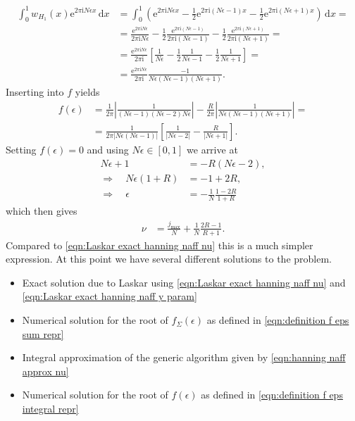 \documentclass[english, parskip=full]{scrartcl}     %
\newcommand{\intx}{}
\newcommand{\kla}{}
\newcommand{\klam}{}
\newcommand{\tecxt}{}
\renewcommand{\i}{\text{i}}
\newcommand{\e}{\text{e}}
\begin{document}
\begin{align}
\intx\int_{0}^{1} w_{H_1}(x) \e^{2\pi\i N\epsilon x} \, \mathrm{d}x &= \intx\int_{0}^{1} \kla\left( \e^{2\pi\i N\epsilon x} - \frac{1}{2} \e^{2\pi\i (N\epsilon - 1) x} - \frac{1}{2} \e^{2\pi\i (N\epsilon + 1) x} \right) \, \mathrm{d}x = \\
&= \frac{\e^{2\pi\i N\epsilon}}{2\pi\i N \epsilon} - \frac{1}{2} \frac{\e^{2\pi\i (N\epsilon - 1)}}{2\pi\i (N\epsilon - 1)} - \frac{1}{2} \frac{\e^{2\pi\i (N\epsilon + 1)}}{2\pi\i (N\epsilon + 1)} = \\
&= \frac{\e^{2\pi\i N\epsilon}}{2\pi\i} \klam\left[ \frac{1}{N\epsilon} - \frac{1}{2} \frac{1}{N\epsilon - 1} - \frac{1}{2} \frac{1}{N\epsilon + 1} \right] = \\
&= \frac{\e^{2\pi\i N\epsilon}}{2\pi\i} \frac{-1}{N\epsilon (N\epsilon - 1) (N\epsilon + 1)}. 
\end{align}
Inserting into $f$ yields
\begin{align}
f(\epsilon) &= \frac{1}{2\pi} \left\vert \frac{1}{(N\epsilon - 1) (N\epsilon - 2) N\epsilon} \right\vert - \frac{R}{2\pi} \left\vert \frac{1}{N\epsilon (N\epsilon - 1) (N\epsilon + 1)} \right\vert = \\
&= \frac{1}{2\pi |N\epsilon (N\epsilon - 1)|} \klam\left[ \frac{1}{|N\epsilon - 2|} - \frac{R}{|N\epsilon + 1|} \right].
\end{align}
Setting $f(\epsilon) = 0$ and using $N\epsilon \in [0, 1]$ we arrive at
\begin{align}
N\epsilon + 1 &= -R(N\epsilon - 2),\\
\Rightarrow\quad N\epsilon (1+R) &= -1 + 2R,\\
\Rightarrow\quad \epsilon &= -\frac{1}{N} \frac{1 - 2R}{1 + R}
\end{align}
which then gives
\begin{align}
\nu &= \frac{j_\tecxt\text{max}}{N} + \frac{1}{N} \frac{2R - 1}{R+1}. \label{eqn:hanning naff approx nu}
\end{align}
Compared to \autoref{eqn:Laskar exact hanning naff nu} this is a much simpler expression.
At this point we have several different solutions to the problem.
\begin{itemize}
\item[1.] Exact solution due to Laskar using \autoref{eqn:Laskar exact hanning naff nu} and \ref{eqn:Laskar exact hanning naff y param}
\item[2.] Numerical solution for the root of $f_\Sigma(\epsilon)$ as defined in \autoref{eqn:definition f eps sum repr}
\item[3.] Integral approximation of the generic algorithm  given by \autoref{eqn:hanning naff approx nu}
\item[4.] Numerical solution for the root of $f(\epsilon)$ as defined in \autoref{eqn:definition f eps integral repr}
\end{itemize}
\end{document}
